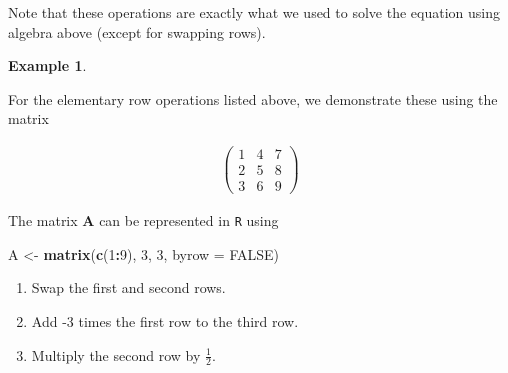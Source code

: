 \documentclass[
]{book}
\newenvironment{Shaded}{\begin{snugshade}}{\end{snugshade}}
\newcommand{\DataTypeTok}[1]{\textcolor[rgb]{0.13,0.29,0.53}{#1}}
\newcommand{\DecValTok}[1]{\textcolor[rgb]{0.00,0.00,0.81}{#1}}
\newcommand{\KeywordTok}[1]{\textcolor[rgb]{0.13,0.29,0.53}{\textbf{#1}}}
\newcommand{\NormalTok}[1]{#1}
\newcommand{\OperatorTok}[1]{\textcolor[rgb]{0.81,0.36,0.00}{\textbf{#1}}}
\newcommand{\OtherTok}[1]{\textcolor[rgb]{0.56,0.35,0.01}{#1}}
\newcommand{\StringTok}[1]{\textcolor[rgb]{0.31,0.60,0.02}{#1}}
\theoremstyle{definition}
\theoremstyle{definition}
\newtheorem{example}{Example}[chapter]
\theoremstyle{definition}
\theoremstyle{remark}
\begin{document}
Note that these operations are exactly what we used to solve the equation using algebra above (except for swapping rows).

\begin{example}
\protect\hypertarget{exm:unlabeled-div-53}{}\label{exm:unlabeled-div-53}

For the elementary row operations listed above, we demonstrate these using the matrix

\[
\begin{aligned}
\begin{pmatrix} 1 & 4 & 7 \\ 2 & 5 & 8 \\ 3 & 6 & 9 \end{pmatrix}
\end{aligned}
\]

The matrix \(\mathbf{A}\) can be represented in \texttt{R} using

\begin{Shaded}
\begin{Highlighting}[]
\NormalTok{A <-}\StringTok{ }\KeywordTok{matrix}\NormalTok{(}\KeywordTok{c}\NormalTok{(}\DecValTok{1}\OperatorTok{:}\DecValTok{9}\NormalTok{), }\DecValTok{3}\NormalTok{, }\DecValTok{3}\NormalTok{, }\DataTypeTok{byrow =} \OtherTok{FALSE}\NormalTok{)}
\end{Highlighting}
\end{Shaded}

\begin{enumerate}
\def\labelenumi{\arabic{enumi})}
\item
  Swap the first and second rows.
\item
  Add -3 times the first row to the third row.
\item
  Multiply the second row by \(\frac{1}{2}\).
\end{enumerate}

\end{example}
\end{document}
